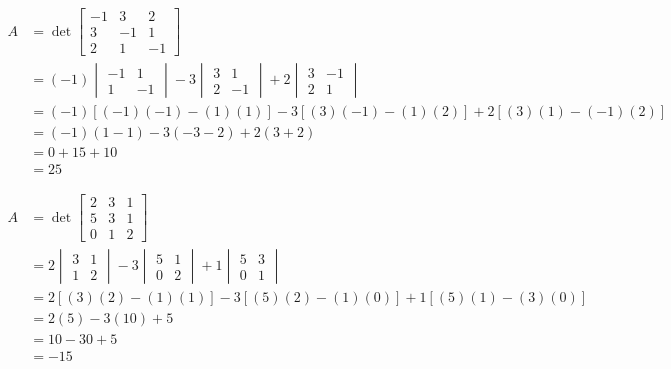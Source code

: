 {  \item[(c)]
  \begin{equation}
  \begin{aligned}
    A &= \det
    \begin{bmatrix}
    -1 & 3 & 2 \\
    3 & -1 & 1 \\
    2 & 1 & -1
    \end{bmatrix} \\[1em]
    &= (-1)
    \begin{vmatrix}
    -1 & 1 \\
    1 & -1
    \end{vmatrix}
    - 3
    \begin{vmatrix}
    3 & 1 \\
    2 & -1
    \end{vmatrix}
    + 2
    \begin{vmatrix}
    3 & -1 \\
    2 & 1
    \end{vmatrix} \\[1em]
    &= (-1)[(-1)(-1)-(1)(1)]
    - 3[(3)(-1)-(1)(2)]
    + 2[(3)(1)-(-1)(2)] \\[1em]
    &= (-1)(1-1)
    - 3(-3-2)
    + 2(3+2) \\[1em]
    &= 0 + 15 + 10 \\[1em]
    &= 25
  \end{aligned}
  \end{equation}

  \item[(d)]
  \begin{equation}
  \begin{aligned}
    A &= \det
    \begin{bmatrix}
    2 & 3 & 1 \\
    5 & 3 & 1 \\
    0 & 1 & 2
    \end{bmatrix} \\[1em]
    &= 2
    \begin{vmatrix}
    3 & 1 \\
    1 & 2
    \end{vmatrix}
    - 3
    \begin{vmatrix}
    5 & 1 \\
    0 & 2
    \end{vmatrix}
    + 1
    \begin{vmatrix}
    5 & 3 \\
    0 & 1
    \end{vmatrix} \\[1em]
    &= 2[(3)(2)-(1)(1)]
    - 3[(5)(2)-(1)(0)]
    + 1[(5)(1)-(3)(0)] \\[1em]
    &= 2(5)-3(10)+5 \\[1em]
    &= 10-30+5 \\[1em]
    &= -15
  \end{aligned}
  \end{equation}
}

